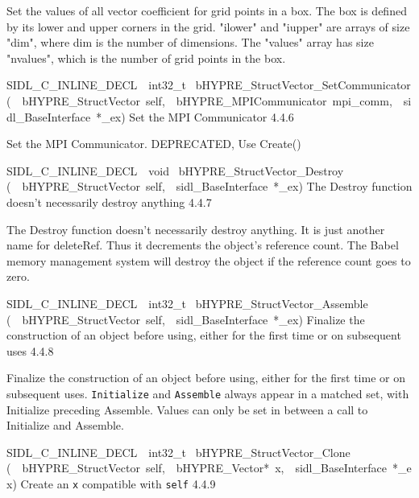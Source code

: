 \documentclass{article}
\begin{document}
\begin{cxxentry}
\begin{cxxentry}
\begin{cxxfunction}
\begin{cxxdoc}
Set the values of all vector coefficient for grid points in a box.
The box is defined by its lower and upper corners in the grid.
"ilower" and "iupper" are arrays of size "dim", where dim is the
number of dimensions.  The "values" array has size "nvalues", which
is the number of grid points in the box. 
\end{cxxdoc}
\end{cxxfunction}
\begin{cxxfunction}
{SIDL\_C\_INLINE\_DECL\ \ int32\_t\ }
        {bHYPRE\_StructVector\_SetCommunicator}
        {(\ \ bHYPRE\_StructVector\ self,\ \ bHYPRE\_MPICommunicator\ mpi\_comm,\ \ sidl\_BaseInterface\ *\_ex)}
        {
Set the MPI Communicator}
        {4.4.6}
\begin{cxxdoc}

Set the MPI Communicator.  DEPRECATED, Use Create()
\end{cxxdoc}
\end{cxxfunction}
\begin{cxxfunction}
{SIDL\_C\_INLINE\_DECL\ \ void\ }
        {bHYPRE\_StructVector\_Destroy}
        {(\ \ bHYPRE\_StructVector\ self,\ \ sidl\_BaseInterface\ *\_ex)}
        {
The Destroy function doesn't necessarily destroy anything}
        {4.4.7}
\begin{cxxdoc}

The Destroy function doesn't necessarily destroy anything.
It is just another name for deleteRef.  Thus it decrements the
object's reference count.  The Babel memory management system will
destroy the object if the reference count goes to zero.
\end{cxxdoc}
\end{cxxfunction}
\begin{cxxfunction}
{SIDL\_C\_INLINE\_DECL\ \ int32\_t\ }
        {bHYPRE\_StructVector\_Assemble}
        {(\ \ bHYPRE\_StructVector\ self,\ \ sidl\_BaseInterface\ *\_ex)}
        {
Finalize the construction of an object before using, either
for the first time or on subsequent uses}
        {4.4.8}
\begin{cxxdoc}

Finalize the construction of an object before using, either
for the first time or on subsequent uses. {\tt Initialize}
and {\tt Assemble} always appear in a matched set, with
Initialize preceding Assemble. Values can only be set in
between a call to Initialize and Assemble.
\end{cxxdoc}
\end{cxxfunction}
\begin{cxxfunction}
{SIDL\_C\_INLINE\_DECL\ \ int32\_t\ }
        {bHYPRE\_StructVector\_Clone}
        {(\ \ bHYPRE\_StructVector\ self,\ \ bHYPRE\_Vector*\ x,\ \ sidl\_BaseInterface\ *\_ex)}
        {
Create an {\tt x} compatible with {\tt self}}
        {4.4.9}
\begin{cxxdoc}


\end{cxxdoc}
\end{cxxfunction}
\end{cxxentry}
\end{cxxentry}
\end{document}
